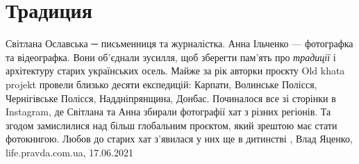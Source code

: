  
 
 
 
 
\chapter{Традиция}
\label{sec:slova.tradicia}

Світлана Ославська ─ письменниця та журналістка. Анна Ільченко — фотографка та
відеографка. Вони об’єднали зусилля, щоб зберегти пам’ять про \emph{традиції} і
архітектуру старих українських осель.  Майже за рік авторки проєкту Old khata
projekt провели близько десяти експедицій: Карпати, Волинське Полісся,
Чернігівське Полісся, Наддніпрянщина, Донбас.  Починалося все зі сторінки в
Instagram, де Світлана та Анна збирали фотографії хат з різних регіонів. Та
згодом замислилися над більш глобальним проєктом, який зрештою має стати
фотокнигою. Любов до старих хат з’явилася у них ще в дитинстві
, 
Влад Яценко, life.pravda.com.ua, 17.06.2021

